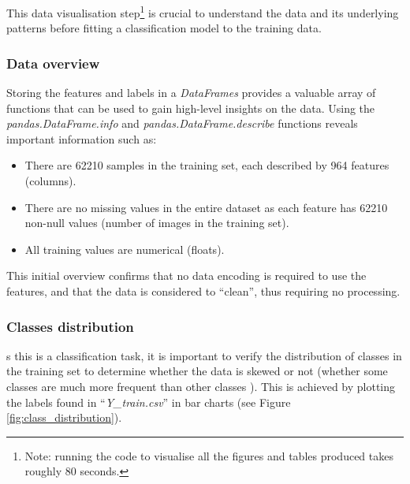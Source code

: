 \documentclass[letterpaper,12pt]{article}
\begin{document}
This data visualisation step\footnote{Note: running the code to visualise all the figures and tables produced takes roughly 80 seconds.} is crucial to understand the data and its underlying patterns before fitting a classification model to the training data.

\subsubsection{Data overview}

Storing the features and labels in a \textit{DataFrames} provides a valuable array of functions that can be used to gain high-level insights on the data. Using the \textit{pandas.DataFrame.info} and \textit{pandas.DataFrame.describe} functions reveals important information such as:
\begin{itemize}
    \item There are 62210 samples in the training set, each described by 964 features (columns).
    \item There are no missing values in the entire dataset as each feature has 62210 non-null values (number of images in the training set).
    \item All training values are numerical (floats).
\end{itemize}

This initial overview confirms that no data encoding is required to use the features, and that the data is considered to ``clean'', thus requiring no processing.

\subsubsection{Classes distribution}
\label{sec:classes-distribution}

s this is a classification task, it is important to verify the distribution of classes in the training  set to determine whether the data is skewed or not (whether some classes are much more frequent than other classes \cite{Geron2019}). This is achieved by plotting the labels found in ``\textit{Y\_train.csv}'' in bar charts (see Figure \ref{fig:class_distribution}).\\
\end{document}
